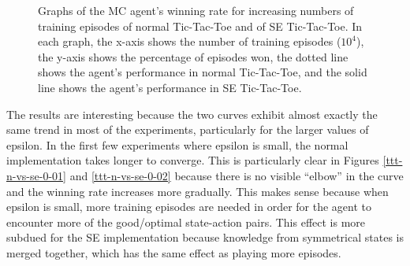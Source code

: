 \documentclass[11pt,a4paper,twoside,openright]{report}
\begin{document}
\begin{figure}

    \caption{Graphs of the MC agent's winning rate for increasing numbers of training episodes of normal Tic-Tac-Toe and of SE Tic-Tac-Toe. In each graph, the x-axis shows the number of training episodes ($10^4$), the y-axis shows the percentage of episodes won, the dotted line shows the agent's performance in normal Tic-Tac-Toe, and the solid line shows the agent's performance in SE Tic-Tac-Toe.}
    \label{fig:tictactoe-normal-vs-symmetric-equality-performance}
\end{figure}

The results are interesting because the two curves exhibit almost exactly the same trend in most of the experiments, particularly for the larger values of epsilon. In the first few experiments where epsilon is small, the normal implementation takes longer to converge. This is particularly clear in Figures \ref{ttt-n-vs-se-0-01} and \ref{ttt-n-vs-se-0-02} because there is no visible ``elbow'' in the curve and the winning rate increases more gradually. This makes sense because when epsilon is small, more training episodes are needed in order for the agent to encounter more of the good/optimal state-action pairs. This effect is more subdued for the SE implementation because knowledge from symmetrical states is merged together, which has the same effect as playing more episodes.
\end{document}
